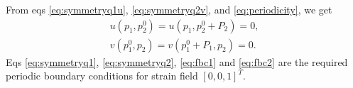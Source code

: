 \documentclass[openright,twoside]{iitkthesis}
\begin{document}
From eqs \eqref{eq:symmetryq1u}, \eqref{eq:symmetryq2v}, and \eqref{eq:periodicity}, we get
\begin{eqnarray}
\label{eq:fbc2}
u(p_1, p_2^0) = u(p_1, p_2^0+P_2) = 0,\\
\label{eq:fbc1}
v(p_1^0, p_2) = v(p_1^0+P_1, p_2) = 0.
\end{eqnarray}
Eqs \eqref{eq:symmetryq1}, \eqref{eq:symmetryq2}, \eqref{eq:fbc1} and 
\eqref{eq:fbc2} are the required periodic boundary conditions for strain field $[0, 0, 1]^T$.\\
\begin{figure}[H]
\begin{center}
\end{center}
\end{figure}
\end{document}
